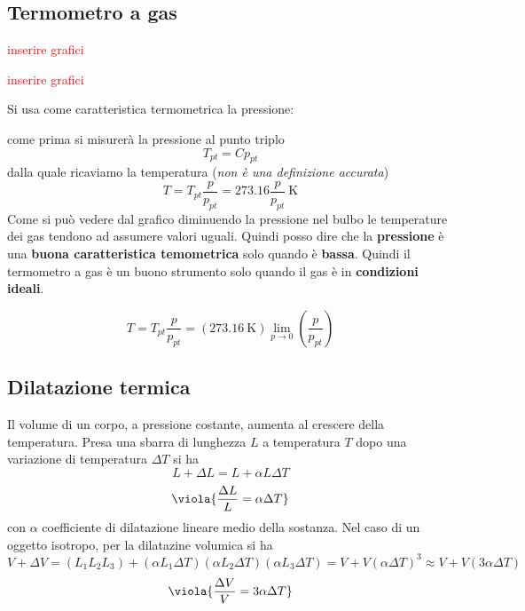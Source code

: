 \subsection{Termometro a gas}
\begin{center}
	\begin{minipage}{0.49\textwidth}
		\begin{center}
			\textcolor{red}{inserire grafici}
		\end{center}
	\end{minipage}
	\begin{minipage}{0.49\textwidth}
		\begin{center}
			\textcolor{red}{inserire grafici}
		\end{center}
	\end{minipage}
\end{center}
Si usa come caratteristica termometrica la pressione:

come prima si misurerà la pressione al punto triplo
\[ 
T_{pt} = Cp_{pt}
\]
dalla quale ricaviamo la temperatura \colorbox{attenzione}{(\textit{non è una definizione accurata})}
\[ 
T = T_{pt}\frac{p}{p_{pt}} = 273.16\frac{p}{p_{pt}}\SI{}{\kelvin}
\]
Come si può vedere dal grafico diminuendo la pressione nel bulbo le temperature dei gas tendono ad assumere valori uguali. Quindi posso dire che la \textbf{pressione} è una \textbf{buona caratteristica temometrica} solo quando è \textbf{bassa}. Quindi il termometro a gas è un buono strumento solo quando il gas è in \textbf{condizioni ideali}.

\[ 
T = T_{pt}\frac{p}{p_{pt}} = \left(\SI{273.16}{\kelvin}\right)\lim_{p\to 0}\left(\frac{p}{p_{pt}}\right)
\]

\subsection{Dilatazione termica}
Il volume di un corpo, a pressione costante, aumenta al crescere della temperatura. Presa una sbarra di lunghezza \(L\) a temperatura \(T\) dopo una variazione di temperatura \(\Delta T\) si ha
\[ 
L +\Delta L = L + \alpha L\Delta T
\]
\[ 
\viola{\frac{\Delta L}{L} = \alpha \Delta T}
\]
con \(\alpha\) coefficiente di dilatazione lineare medio della sostanza. Nel caso di un oggetto isotropo, per la dilatazine volumica si ha
\[ 
V + \Delta V = \left(L_1L_2L_3\right) + \left(\alpha L_1 \Delta T\right)\left(\alpha L_2 \Delta T\right)\left(\alpha L_3 \Delta T\right) = V + V(\alpha \Delta T)^3 \approx V + V(3\alpha \Delta T)
\]
\[ 
\viola{\frac{\Delta V}{V} = 3\alpha \Delta T}
\]



